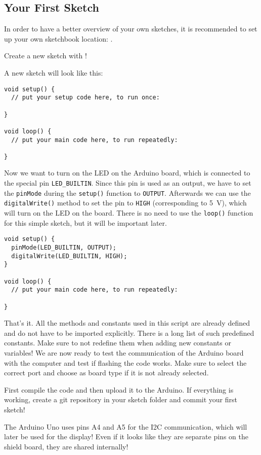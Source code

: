 \subsection{Your First Sketch}
In order to have a better overview of your own sketches, it is recommended to set up your own sketchbook location: .
%
\begin{task}
  \item Create a new sketch with !
\end{task}
%
A new sketch will look like this:
\begin{verbatim}
void setup() {
  // put your setup code here, to run once:

}

void loop() {
  // put your main code here, to run repeatedly:

}
\end{verbatim}
%
Now we want to turn on the LED on the Arduino board, which is connected to the special pin \texttt{LED_BUILTIN}. Since this pin is used as an output, we have to set the \texttt{pinMode} during the \texttt{setup()} function to \texttt{OUTPUT}. Afterwards we can use the \texttt{digitalWrite()} method to set the pin to \texttt{HIGH} (corresponding to \SI{5}{\V}), which will turn on the LED on the board. There is no need to use the \texttt{loop()} function for this simple sketch, but it will be important later.
%
\begin{verbatim}
void setup() {
  pinMode(LED_BUILTIN, OUTPUT);
  digitalWrite(LED_BUILTIN, HIGH);
}

void loop() {
  // put your main code here, to run repeatedly:

}
\end{verbatim}
%
That's it. All the methods and constants used in this script are already defined and do not have to be imported explicitly. There is a long list of such predefined constants. Make sure to not redefine them when adding new constants or variables!
We are now ready to test the communication of the Arduino board with the computer and test if flashing the code works. Make sure to select the correct port and choose  as board type if it is not already selected.\newline
%
\begin{task}
  First compile the code and then upload it to the Arduino. If everything is working, create a git repository in your sketch folder and commit your first sketch!
\end{task}
%
\begin{note}
  The Arduino Uno uses pins A4 and A5 for the \ac{I2C} communication, which will later be used for the display! Even if it looks like they are separate pins on the shield board, they are shared internally!
\end{note}
%
